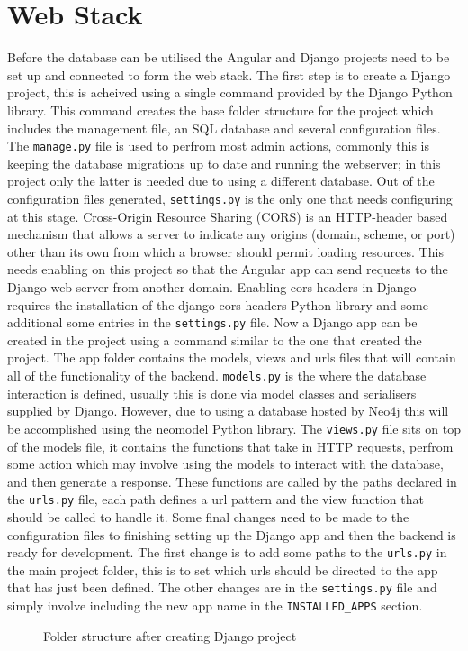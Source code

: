 \section{Web Stack}
Before the database can be utilised the Angular and Django projects need to be set up and connected to form the web stack.
The first step is to create a Django project, this is acheived using a single command provided by the Django Python library. 
This command creates the base folder structure for the project which includes the management file, an SQL database and several configuration files.
The \verb|manage.py| file is used to perfrom most admin actions, commonly this is keeping the database migrations up to date and running the webserver; 
in this project only the latter is needed due to using a different database. Out of the configuration files generated, \verb|settings.py| 
is the only one that needs configuring at this stage. Cross-Origin Resource Sharing (CORS) is an HTTP-header based mechanism that allows a server to 
indicate any origins (domain, scheme, or port) other than its own from which a browser should permit loading resources.\cite{CrossOriginResourceSharing2023}
This needs enabling on this project so that the Angular app can send requests to the Django web server from another domain. Enabling cors headers in Django 
requires the installation of the django-cors-headers Python library and some additional some entries in the \verb|settings.py| file. 
Now a Django app can be created in the project using a command similar to the one that created the project. The app folder contains the models, views and urls files 
that will contain all of the functionality of the backend. \verb|models.py| is the where the database interaction is defined, usually this is done via model classes 
and serialisers supplied by Django. However, due to using a database hosted by Neo4j this will be accomplished using the neomodel Python library. 
The \verb|views.py| file sits on top of the models file, it contains the functions that take in HTTP requests, perfrom some action which may involve using the models 
to interact with the database, and then generate a response. These functions are called by the paths declared in the \verb|urls.py| file, each path defines a url pattern 
and the view function that should be called to handle it. Some final changes need to be made to the configuration files to finishing setting up the Django app and then the 
backend is ready for development. The first change is to add some paths to the \verb|urls.py| in the main project folder, this is to set which urls should be directed 
to the app that has just been defined. The other changes are in the \verb|settings.py| file and simply involve including the new app name in the \verb|INSTALLED_APPS| 
section.
\begin{figure}
    \caption{Folder structure after creating Django project}
\end{figure}

